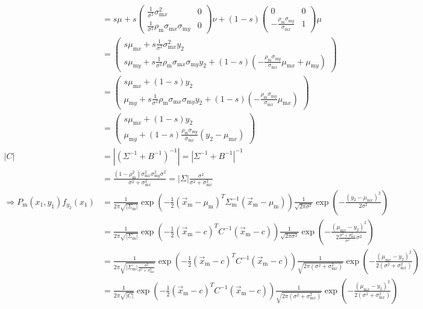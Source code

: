 \documentclass{article}
\newcommand{\x}[1]{\text{#1}}
\begin{document}
\begin{landscape}
\begin{align*}
\\&=s\mu+s\left(\begin{array}{cc}\frac{1}{\sigma^2}\sigma_{\x{m}x}^2 & 0 \\ \frac{1}{\sigma^2}\rho_\x{m}\sigma_{\x{m}x}\sigma_{\x{m}y} & 0 \end{array}\right)\nu+(1-s)\left(\begin{array}{cc}0 & 0 \\ -\frac{\rho_\x{m}\sigma_{\x{m}y}}{\sigma_{\x{m}x}} & 1 \end{array}\right)\mu
\\&=\left(\begin{array}{cc}s\mu_{\x{m}x}+s\frac{1}{\sigma^2}\sigma_{\x{m}x}^2y_2 \\ s\mu_{\x{m}y}+s\frac{1}{\sigma^2}\rho_\x{m}\sigma_{\x{m}x}\sigma_{\x{m}y}y_2+(1-s)(-\frac{\rho_\x{m}\sigma_{\x{m}y}}{\sigma_{\x{m}x}}\mu_{\x{m}x}+\mu_{\x{m}y}) \end{array}\right)
\\&=\left(\begin{array}{cc}s\mu_{\x{m}x}+(1-s)y_2 \\ \mu_{\x{m}y}+s\frac{1}{\sigma^2}\rho_\x{m}\sigma_{\x{m}x}\sigma_{\x{m}y}y_2+(1-s)(-\frac{\rho_\x{m}\sigma_{\x{m}y}}{\sigma_{\x{m}x}}\mu_{\x{m}x}) \end{array}\right)
\\&=\left(\begin{array}{cc}s\mu_{\x{m}x}+(1-s)y_2 \\ \mu_{\x{m}y}+(1-s)\frac{\rho_\x{m}\sigma_{\x{m}y}}{\sigma_{\x{m}x}}(y_2-\mu_{\x{m}x}) \end{array}\right)
\\ |C|&=|(\Sigma^{-1}+B^{-1})^{-1}|=|\Sigma^{-1}+B^{-1}|^{-1}
\\&=\frac{(1-\rho_\x{m}^2)\sigma_{\x{m}x}^2\sigma_{\x{m}y}^2\sigma^2}{\sigma^2+\sigma_{\x{m}x}^2}=|\Sigma|\frac{\sigma^2}{\sigma^2+\sigma_{\x{m}x}^2}
\\ \Rightarrow P_\x{m}(x_1,y_1)f_{y_2}(x_1)&=\frac{1}{2\pi\sqrt{|\Sigma_\x{m}|}}\exp\left(-\frac{1}{2}(\vec{x}_\x{m}-\mu_\x{m})^T\Sigma_\x{m}^{-1}(\vec{x}_\x{m}-\mu_\x{m})\right)\frac{1}{\sqrt{2\pi\sigma^2}}\exp\left(-\frac{(y_2-\mu_{\x{m}x})^2}{2\sigma^2}\right)
\\ &=\frac{1}{2\pi\sqrt{|\Sigma_\x{m}|}}\exp\left(-\frac{1}{2}(\vec{x}_\x{m}-c)^TC^{-1}(\vec{x}_\x{m}-c)\right)\frac{1}{\sqrt{2\pi\sigma^2}}\exp\left(-\frac{(\mu_{\x{m}x}-y_2)^2}{2\frac{\sigma^2+\sigma_{\x{m}x}^2}{\sigma^2}\sigma^2}\right)
\\ &=\frac{1}{2\pi\sqrt{|\Sigma_\x{m}|\frac{\sigma^2}{\sigma^2+\sigma_{\x{m}x}^2}}}\exp\left(-\frac{1}{2}(\vec{x}_\x{m}-c)^TC^{-1}(\vec{x}_\x{m}-c)\right)\frac{1}{\sqrt{2\pi(\sigma^2+\sigma_{\x{m}x}^2)}}\exp\left(-\frac{(\mu_{\x{m}x}-y_2)^2}{2(\sigma^2+\sigma_{\x{m}x}^2)}\right)
\\ &=\frac{1}{2\pi\sqrt{|C|}}\exp\left(-\frac{1}{2}(\vec{x}_\x{m}-c)^TC^{-1}(\vec{x}_\x{m}-c)\right)\frac{1}{\sqrt{2\pi(\sigma^2+\sigma_{\x{m}x}^2)}}\exp\left(-\frac{(\mu_{\x{m}x}-y_2)^2}{2(\sigma^2+\sigma_{\x{m}x}^2)}\right)
\end{align*}


\end{landscape}
\end{document}
